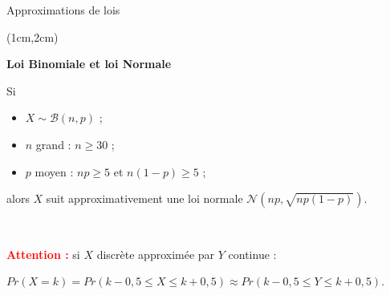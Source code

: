 \documentclass{beamer}
\begin{document}
\begin{frame}{Approximations de lois}
\begin{textblock*}{\textwidth}(1cm,2cm)

\begin{center}{\bf \Large Loi Binomiale et loi Normale } \end{center}

\begin{minipage}{0.5\textwidth}
Si 
\begin{itemize}
\item $X\sim \mathcal{B}(n,p)$ ;
\item $n$ grand : $n\geq 30$ ;
\item $p$ moyen : $np\geq 5$ et  $n(1-p)\geq 5$ ;
\end{itemize}
\end{minipage}
\begin{minipage}{0.3 \textwidth}
\begin{center}
\end{center}
\end{minipage}

alors $X$ suit approximativement une loi normale \small $\mathcal{N}(np, \sqrt{np(1-p)})$.
 
 \
 
  \textcolor{red}{\bf Attention :} si $X$ discrète approximée  par $Y$ continue :

 \small $
Pr(X=k)=Pr(k-0,5 \leq X \leq k+0,5) \approx Pr( k-0,5 \leq Y \leq
k+0,5).
$

\end{textblock*}

\end{frame} 
\end{document}
